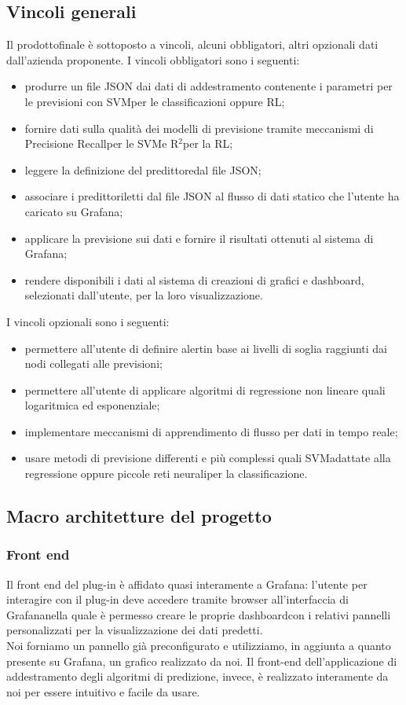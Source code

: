 	\subsection{Vincoli generali}
	Il prodotto\glosp finale è sottoposto a vincoli, alcuni obbligatori, altri opzionali dati dall'azienda proponente.
	I vincoli obbligatori sono i seguenti:
	\begin{itemize}
		\item produrre un file JSON dai dati di addestramento contenente i parametri per le previsioni con SVM\glosp per le classificazioni oppure RL\glo;
		\item fornire dati sulla qualità dei modelli di previsione tramite meccanismi di Precision\glosp e Recall\glosp per le SVM\glosp e R$^{2}$\glosp per la RL\glo;
		\item leggere la definizione del predittore\glosp dal file JSON;
		\item associare i predittori\glosp letti dal file JSON al flusso di dati statico che l'utente ha caricato su Grafana\glo;
		\item applicare la previsione sui dati e fornire il risultati ottenuti al sistema di Grafana\glo;
		\item rendere disponibili i dati al sistema di creazioni di grafici e dashboard\glo, selezionati dall'utente, per la loro visualizzazione.
	\end{itemize}
	I vincoli opzionali sono i seguenti:
	\begin{itemize}
		\item permettere all'utente di definire alert\glosp in base ai livelli di soglia raggiunti dai nodi collegati alle previsioni;
		\item permettere all'utente di applicare algoritmi di regressione non lineare quali logaritmica ed esponenziale;
		\item implementare meccanismi di apprendimento di flusso per dati in tempo reale;
		\item usare metodi di previsione differenti e più complessi quali SVM\glosp adattate alla regressione oppure piccole reti neurali\glosp per la classificazione.
	\end{itemize}
	\subsection{Macro architetture del progetto}
		\subsubsection{Front end}
		Il front end del plug-in è affidato quasi interamente a Grafana\glo: l'utente per interagire con il plug-in deve accedere tramite browser all'interfaccia di Grafana\glosp nella quale è permesso creare le proprie dashboard\glosp con i relativi pannelli personalizzati per la visualizzazione dei dati predetti. \\
		Noi forniamo un pannello già preconfigurato e utilizziamo, in aggiunta a quanto presente su Grafana\glo, un grafico realizzato da noi.
		Il front-end dell'applicazione di addestramento degli algoritmi di predizione, invece, è realizzato interamente da noi per essere intuitivo e facile da usare.
